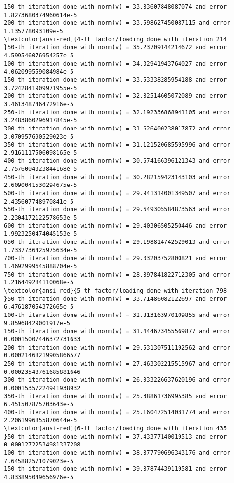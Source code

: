 \documentclass[11pt]{article}
\begin{document}
\begin{Verbatim}[commandchars=\\\{\}]
150-th iteration done with norm(v) = 33.83607848087074 and error 1.8273680374960614e-5
200-th iteration done with norm(v) = 33.598627450087115 and error 1.135778093109e-5
\textcolor{ansi-red}{4-th factor/loading done with iteration 214
}50-th iteration done with norm(v) = 35.23709144214672 and error 4.599546076954257e-5
100-th iteration done with norm(v) = 34.32941943764027 and error 4.062099559084984e-5
150-th iteration done with norm(v) = 33.53338285954188 and error 3.7242841909971955e-5
200-th iteration done with norm(v) = 32.82514605072089 and error 3.461348746472916e-5
250-th iteration done with norm(v) = 32.192336868941105 and error 3.2483860296917845e-5
300-th iteration done with norm(v) = 31.626400238017872 and error 3.070957690529023e-5
350-th iteration done with norm(v) = 31.121520685595996 and error 2.9161117506098165e-5
400-th iteration done with norm(v) = 30.674166396121343 and error 2.7576004323844168e-5
450-th iteration done with norm(v) = 30.282159423143103 and error 2.6090041530294675e-5
500-th iteration done with norm(v) = 29.941314001349507 and error 2.435607748970841e-5
550-th iteration done with norm(v) = 29.649305584873563 and error 2.2304172122578653e-5
600-th iteration done with norm(v) = 29.40306505250446 and error 1.9923250474045153e-5
650-th iteration done with norm(v) = 29.198814742529013 and error 1.7337736425975634e-5
700-th iteration done with norm(v) = 29.03203752800821 and error 1.4692999645888704e-5
750-th iteration done with norm(v) = 28.897841822712305 and error 1.216449284110068e-5
\textcolor{ansi-red}{5-th factor/loading done with iteration 798
}50-th iteration done with norm(v) = 33.71486082122697 and error 6.476187054372665e-5
100-th iteration done with norm(v) = 32.813163970109855 and error 9.85968429001917e-5
150-th iteration done with norm(v) = 31.444673455569877 and error 0.00015007446372731633
200-th iteration done with norm(v) = 29.531307511192562 and error 0.00021468219905866577
250-th iteration done with norm(v) = 27.463302215515967 and error 0.00023548761685881646
300-th iteration done with norm(v) = 26.033226637620196 and error 0.00015357224941938932
350-th iteration done with norm(v) = 25.38861736995385 and error 6.451507875703643e-5
400-th iteration done with norm(v) = 25.160472514031774 and error 2.2061996855870644e-5
\textcolor{ansi-red}{6-th factor/loading done with iteration 435
}50-th iteration done with norm(v) = 37.43377140019513 and error 0.00012722534981337208
100-th iteration done with norm(v) = 38.877790696343176 and error 7.645882571079023e-5
150-th iteration done with norm(v) = 39.87874439119581 and error 4.833895049656976e-5

\end{Verbatim}
\end{document}
